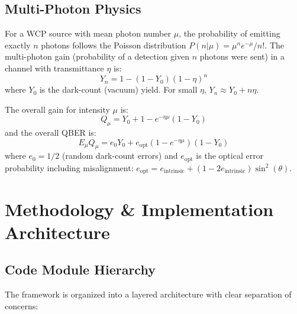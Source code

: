 \documentclass[11pt,a4paper,oneside]{report}
\begin{document}
\section{Multi-Photon Physics}

For a WCP source with mean photon number $\mu$, the probability of emitting exactly $n$ photons follows the Poisson distribution $P(n|\mu) = \mu^n e^{-\mu}/n!$. The multi-photon gain (probability of a detection given $n$ photons were sent) in a channel with transmittance $\eta$ is:
\begin{equation}
Y_n = 1 - (1 - Y_0)(1 - \eta)^n
\end{equation}
where $Y_0$ is the dark-count (vacuum) yield. For small $\eta$, $Y_n \approx Y_0 + n\eta$.

The overall gain for intensity $\mu$ is:
\begin{equation}
Q_\mu = Y_0 + 1 - e^{-\eta\mu}(1-Y_0)
\end{equation}
and the overall QBER is:
\begin{equation}
E_\mu Q_\mu = e_0 Y_0 + e_{\text{opt}}(1 - e^{-\eta\mu})(1 - Y_0)
\end{equation}
where $e_0 = 1/2$ (random dark-count errors) and $e_{\text{opt}}$ is the optical error probability including misalignment: $e_{\text{opt}} = e_{\text{intrinsic}} + (1-2e_{\text{intrinsic}})\sin^2(\theta)$.


\chapter{Methodology \& Implementation Architecture}

\section{Code Module Hierarchy}

The framework is organized into a layered architecture with clear separation of concerns:
\end{document}

